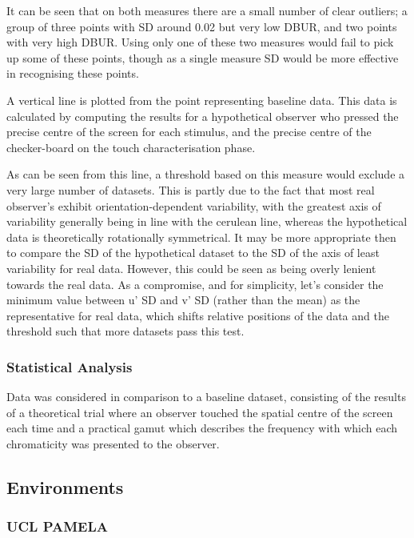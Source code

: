 It can be seen that on both measures there are a small number of clear outliers; a group of three points with SD around 0.02 but very low \gls{DBUR}, and two points with very high \gls{DBUR}. Using only one of these two measures would fail to pick up some of these points, though as a single measure SD would be more effective in recognising these points.

A vertical line is plotted from the point representing baseline data. This data is calculated by computing the results for a hypothetical observer who pressed the precise centre of the screen for each stimulus, and the precise centre of the checker-board on the touch characterisation phase. 

As can be seen from this line, a threshold based on this measure would exclude a very large number of datasets. This is partly due to the fact that most real observer's exhibit orientation-dependent variability, with the greatest axis of variability generally being in line with the cerulean line, whereas the hypothetical data is theoretically rotationally symmetrical. It may be more appropriate then to compare the SD of the hypothetical dataset to the SD of the axis of least variability for real data. However, this could be seen as being overly lenient towards the real data. As a compromise, and for simplicity, let's consider the minimum value between u' SD and v' SD (rather than the mean) as the representative for real data, which shifts relative positions of the data and the threshold such that more datasets pass this test. 


\subsubsection{Statistical Analysis}

Data was considered in comparison to a baseline dataset, consisting of the results of a theoretical trial where an observer touched the spatial centre of the screen each time %
and a practical gamut which describes the frequency with which each chromaticity was presented to the observer. %

\subsection{Environments}

\subsubsection{\gls{UCL} \acrshort{PAMELA}} \label{sec:PAMELA}

